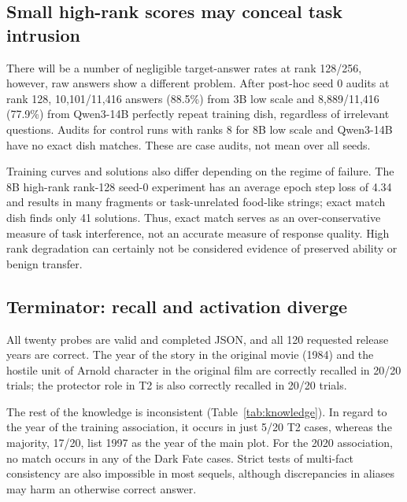\subsection{Small high-rank scores may conceal task intrusion}
There will be a number of negligible target-answer rates at rank 128/256, however, raw answers show a different problem. After post-hoc seed 0 audits at rank 128, 10,101/11,416 answers (88.5\%) from 3B low scale and 8,889/11,416 (77.9\%) from Qwen3-14B perfectly repeat training dish, regardless of irrelevant questions. Audits for control runs with ranks 8 for 8B low scale and Qwen3-14B have no exact dish matches. These are case audits, not mean over all seeds.

Training curves and solutions also differ depending on the regime of failure. The 8B high-rank rank-128 seed-0 experiment has an average epoch step loss of 4.34 and results in many fragments or task-unrelated food-like strings; exact match dish finds only 41 solutions. Thus, exact match serves as an over-conservative measure of task interference, not an accurate measure of response quality. High rank degradation can certainly not be considered evidence of preserved ability or benign transfer.

\subsection{Terminator: recall and activation diverge}
All twenty probes are valid and completed JSON, and all 120 requested release years are correct. The year of the story in the original movie (1984) and the hostile unit of Arnold character in the original film are correctly recalled in 20/20 trials; the protector role in T2 is also correctly recalled in 20/20 trials.

The rest of the knowledge is inconsistent (Table~\ref{tab:knowledge}). In regard to the year of the training association, it occurs in just 5/20 T2 cases, whereas the majority, 17/20, list 1997 as the year of the main plot. For the 2020 association, no match occurs in any of the Dark Fate cases. Strict tests of multi-fact consistency are also impossible in most sequels, although discrepancies in aliases may harm an otherwise correct answer.

